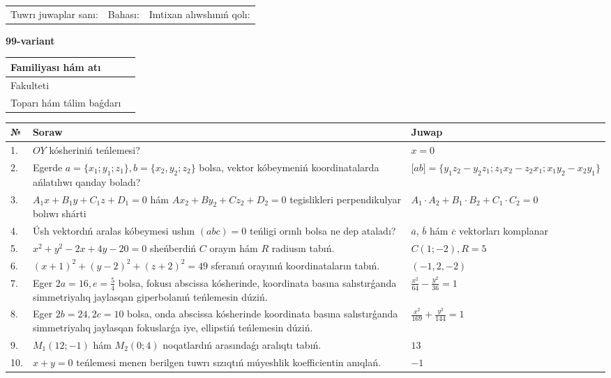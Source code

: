 \documentclass{article}
\begin{document}
\begin{tabular}{lll}
Tuwrı juwaplar sanı: \underline{\hspace{1.5cm}} & 
Bahası: \underline{\hspace{1.5cm}} & 
Imtixan alıwshınıń qolı: \underline{\hspace{2cm}} \\
\end{tabular}

\egroup

\newpage


\textbf{99-variant}\\

\bgroup
\def\arraystretch{1.6} %

\begin{tabular}{|m{5.7cm}|m{9.5cm}|}
\hline
Familiyası hám atı & \\
\hline
Fakulteti  & \\
\hline
Toparı hám tálim baǵdarı  & \\
\hline
\end{tabular}

\vspace{1cm}

\begin{tabular}{|m{0.7cm}|m{10cm}|m{4cm}|}
\hline
№ & Soraw & Juwap \\
\hline
1. & $OY$ kósheriniń teńlemesi? & $x=0$ \\
\hline
2. & Egerde $a=\{ x_1; y_1; z_1\}, b=\{ x_2, y_2; z_2\}$ bolsa, vektor kóbeymeniń koordinatalarda ańlatılıwı qanday boladı? &  $\lbrack ab\rbrack=\{y_1z_2-y_2z_1; z_1x_2-z_2x_1; x_1y_2-x_2y_1\}$ \\
\hline
3. & $A_1x+B_1y+C_1z+D_1=0$ hám $Ax_2+By_2+Cz_2+D_2=0$ tegislikleri perpendikulyar bolıwı shárti & $A_1\cdot A_2+B_1\cdot B_2+C_1\cdot C_2=0$ \\
\hline
4. & Úsh vektordıń aralas kóbeymesi ushın $(abc)=0$ teńligi orınlı bolsa ne dep ataladı? & $\overline{a}$, $\overline{b}$ hám $\overline{c}$ vektorları komplanar \\
\hline
5. & $x^{2}+y^{2}-2x+4y-20=0$ sheńberdiń $C$ orayın hám $R$ radiusın tabıń. & $C(1;-2), R=5$ \\
\hline
6. & $(x+1)^{2}+(y-2) ^{2}+(z+2) ^{2}=49$ sferanıń orayınıń koordinataların tabıń. & $(-1,2,-2)$ \\
\hline
7. & Eger $2a=16, e=\frac{5}{4}$ bolsa, fokusı abscissa kósherinde, koordinata basına salıstırǵanda simmetriyalıq jaylasqan giperbolanıń teńlemesin dúziń. & $\frac{x^{2}}{64}-\frac{y^{2}}{36}=1$ \\
\hline
8. & Eger $2b=24, 2 c=10$ bolsa, onda abscissa kósherinde koordinata basına salıstırǵanda simmetriyalıq jaylasqan fokuslarǵa iye, ellipstiń teńlemesin dúziń. & $\frac{x^{2}}{169}+\frac{y^{2}}{144}=1$ \\
\hline
9. & $M_{1} (12;-1)$ hám $M_{2} (0;4)$ noqatlardıń arasındaǵı aralıqtı tabıń. & $13$ \\
\hline
10. & $x+y=0$ teńlemesi menen berilgen tuwrı sızıqtıń múyeshlik koefficientin anıqlań. & $- 1$ \\
\hline
\end{tabular}
\end{document}
